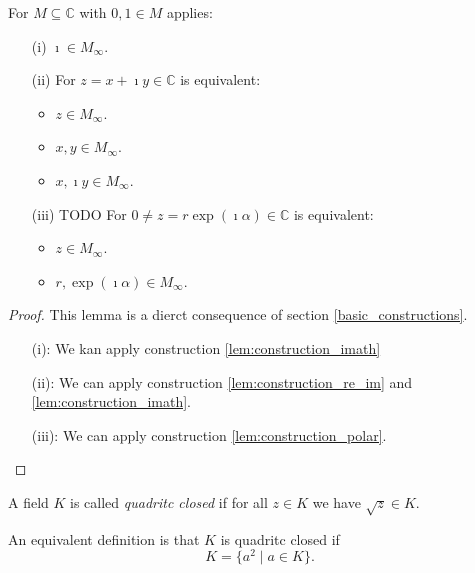 \begin{lemma}
    \label{lem:M_inf_properties}
    \leanok
    For $M\subseteq \mathbb{C}$ with $0,1 \in M$ applies:
    \begin{itemize}
        \item[(i)] $\imath \in M_{\infty}$.
        \item[(ii)] For $z = x + \imath y \in \mathbb{C}$ is equivalent:
            \begin{itemize}
                \item $z \in M_{\infty}$.
                \item $x, y \in M_{\infty}$.
                \item $x, \imath y \in M_{\infty}$.
            \end{itemize}
        \item[(iii)] 
            TODO For $0 \ne z = r \exp(\imath \alpha) \in \mathbb{C}$ is equivalent:
            \begin{itemize}
                \item $z \in M_{\infty}$.
                \item $r,\exp(\imath \alpha) \in M_{\infty}$.
            \end{itemize}
    \end{itemize}
\end{lemma}
\begin{proof}
    This lemma is a dierct consequence of section \ref{basic_constructions}.
    \begin{itemize}
        \item[(i):] We kan apply construction \ref{lem:construction_imath}
        \item[(ii):] We can apply construction \ref{lem:construction_re_im} and \ref{lem:construction_imath}.
        \item[(iii):]  We can apply construction \ref{lem:construction_polar}.
    \end{itemize}
\end{proof}

\begin{definition}
    \label{def:quadritc_closed_field}
    \leanok
    A field $K$ is called \emph{quadritc closed} if for all $z \in K$ we have $\sqrt{z} \in K$.
\end{definition}
\begin{remark}
    An equivalent definition is that $K$ is quadritc closed if $$K=\{a^2\mid a \in K\}.$$ 
\end{remark}

